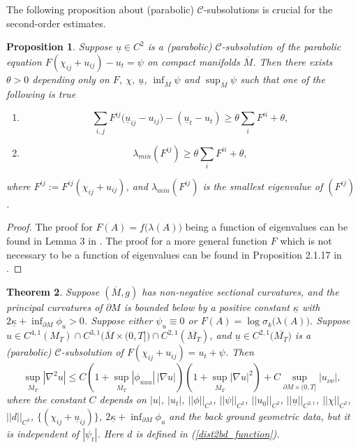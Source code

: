 \documentclass[12pt]{amsart}
\newtheorem{theorem}{Theorem}[section]
\newtheorem{proposition}[theorem]{Proposition}
\theoremstyle{definition}
\theoremstyle{remark}
\numberwithin{equation}{section}
\begin{document}
The following proposition about (parabolic) $\mathcal{C}$-subsolutions is crucial for the second-order estimates.
\begin{proposition}\label{para_sub_key_1}
	Suppose $\underline{u}\in C^2$ is a (parabolic) $\mathcal{C}$-subsolution of the parabolic equation $F(\chi_{ij} + u_{ij}) - u_t = \psi$ on compact manifolds $\overline{M}$.
	Then there exists $\theta > 0$ depending only on $F$, $\chi$, $\underline{u}$, $\inf_{\overline{M}} \psi$ and $\sup_{\overline{M}} \psi$ such that one of the following is true
	\begin{enumerate}
		\item 
		\begin{equation}
		\sum_{i,j} F^{ij} \big( \underline{u}_{ij} - u_{ij} \big) - (\underline{u}_t - u_t) \geq \theta \sum_{i} F^{ii} + \theta,
		\end{equation}
		\item 
		\begin{equation}
		\lambda_{min}(F^{ij}) \geq \theta \sum_{i} F^{ii} + \theta,
		\end{equation}
	\end{enumerate}
	where $F^{ij} := F^{ij}(\chi_{ij} + u_{ij})$, and $\lambda_{min}(F^{ij})$ is the smallest eigenvalue of $(F^{ij})$.
\end{proposition}
\begin{proof}
	The proof for $F(A) = f\big(\lambda(A)\big)$ being a function of eigenvalues can be found in Lemma 3 in \cite{PhongTo17}. The proof for a more general function $F$ which is not necessary to be a function of eigenvalues can be found in Proposition 2.1.17 in \cite{GuoThesis19}.
\end{proof}

\begin{theorem}\label{C2_interior_estimate}
	Suppose $(\overline{M}, g)$ has non-negative sectional curvatures, and the principal curvatures of $\partial M$ is bounded below by a positive constant $\underline{\kappa}$ with $2\underline{\kappa} + \inf_{\partial M} \phi_u > 0$. 
	Suppose either $\psi_u \equiv 0$ or $F(A) = \log \sigma_k \big(\lambda(A)\big)$.
	Suppose $u\in C^{4, 1}(M_T) \cap C^{3, 1}\big(\overline{M}\times (0, T]\big) \cap C^{2, 1}(\overline{M_T})$, and $\underline{u} \in C^{2, 1}\big(\overline{M_T}\big)$ is a (parabolic) $\mathcal{C}$-subsolution of $F(\chi_{ij} + u_{ij}) = u_t + \psi$. Then
	\begin{equation}\label{C2_interior}
	\sup_{\overline{M_T}} |\nabla^2 u| \leq C \left(1 + \sup_{\overline{M_T}}|\phi_{uuu}|\, |\nabla u|\right) \left( 1 + \sup_{\overline{M_T}} |\nabla u|^2 \right) + C \sup_{\partial M \times (0, T]} |u_{\nu\nu}|,
	\end{equation}
	where the constant $C$ depends on $|u|$, $|u_t|$,  $||\phi||_{C^3}$, $||\psi||_{C^2}$, $||u_0||_{C^{2}}$, $||\underline{u}||_{C^{2, 1}}$, $||\chi||_{C^2}$, $||d||_{C^4}$, $\big\{(\chi_{ij} + \underline{u}_{ij})\big\}$, $2\underline{\kappa} + \inf_{\partial M} \phi_u$ and the back ground geometric data, but it is independent of $|\psi_t|$. 
	Here $d$ is defined in (\ref{dist2bd_function}).
\end{theorem}
\end{document}
